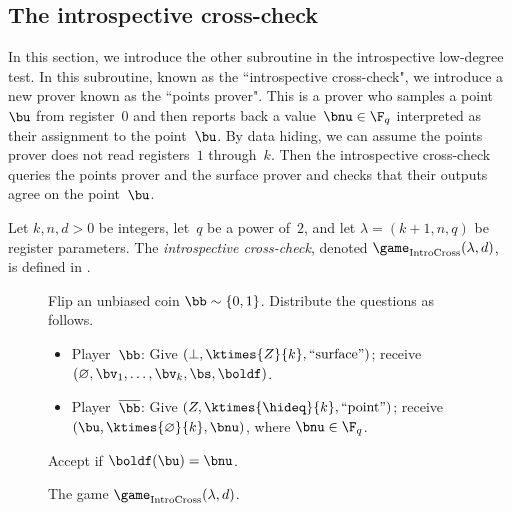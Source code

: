 \subsection{The introspective cross-check}
In this section, we introduce the other subroutine in the introspective low-degree test.
In this subroutine, known as the ``introspective cross-check",
we introduce a new prover known as the ``points prover".
This is a prover who samples a point~$\bu$ from register~$0$ 
and then reports back a value~$\bnu \in \F_q$
interpreted as their assignment to the point~$\bu$.
By data hiding, we can assume the points prover does not read registers~$1$ through~$k$.
Then the introspective cross-check queries the points prover and the surface prover
and checks that their outputs agree on the point~$\bu$.


\begin{definition}
Let $k, n, d>0$ be integers, let~$q$ be a power of~$2$,
and let $\lambda = (k+1, n, q)$ be register parameters.
The \emph{introspective cross-check}, denoted $\game_{\mathrm{IntroCross}}(\lambda, d)$, is defined in .
\end{definition}
{
\begin{figure}
Flip an unbiased coin $\bb \sim \{0, 1\}$.
Distribute the questions as follows. \label{item:big-low-degree-test}
		\begin{itemize}
		\item[$\circ$] Player~$\bb$: Give $(\bot, \ktimes{Z}{k}, \mathrm{``surface"})$; receive
        $(\varnothing, \bv_1, \dots, \bv_k, \bs, \boldf)$.
		\item[$\circ$] Player~$\overline{\bb}$: Give $(Z, \ktimes{\hideq}{k}, \mathrm{``point"})$;
				receive $(\bu, \ktimes{\varnothing}{k}, \bnu)$, where $\bnu \in \F_q$.
		\end{itemize}
		Accept if $\boldf(\bu) = \bnu$.
	\caption{The game $\game_{\mathrm{IntroCross}}(\lambda, d)$.\label{fig:big-cross-check}}
\end{figure}
}

